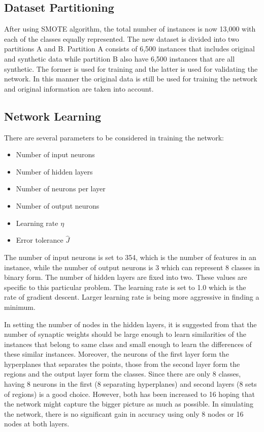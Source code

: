 \documentclass{article}
\begin{document}
\subsection{Dataset Partitioning}

After using SMOTE algorithm, the total number of instances is now 13,000 with each of the classes equally represented. The new dataset is divided into two partitions A and B. Partition A consists of 6,500 instances that includes original and synthetic data while partition B also have 6,500 instances that are all synthetic. The former is used for training and the latter is used for validating the network. In this manner the original data is still be used for training the network and original information are taken into account.

\subsection{Network Learning}

There are several parameters to be considered in training the network:
\begin{itemize}
	\item Number of input neurons
	\item Number of hidden layers
	\item Number of neurons per layer
	\item Number of output neurons
	\item Learning rate $\eta$
	\item Error tolerance $\hat{J}$
\end{itemize}

The number of input neurons is set to 354, which is the number of features in an instance, while the number of output neurons is 3 which can represent 8 classes in binary form. The number of hidden layers are fixed into two. These values are specific to this particular problem. The learning rate is set to 1.0 which is the rate of gradient descent. Larger learning rate is being more aggressive in finding a minimum.

In setting the number of nodes in the hidden layers, it is suggested from \cite{bib:pat} that the number of synaptic weights should be large enough to learn similarities of the instances that belong to same class and small enough to learn the differences of these similar instances. Moreover, the neurons of the first layer form the hyperplanes that separates the points, those from the second layer form the regions and the output layer form the classes\cite{bib:pat}. Since there are only 8 classes, having 8 neurons in the first (8 separating hyperplanes) and second layers (8 sets of regions) is a good choice. However, both has been increased to 16 hoping that the network might capture the bigger picture as much as possible. In simulating the network, there is no significant gain in accuracy using only 8 nodes or 16 nodes at both layers.
\end{document}

